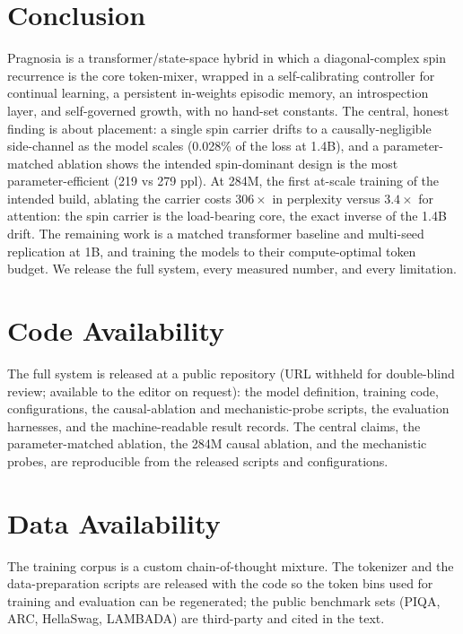 \documentclass[10pt,twocolumn]{article}
\begin{document}
\section{Conclusion}
Pragnosia is a transformer/state-space hybrid in which a diagonal-complex spin recurrence is the core token-mixer, wrapped in a self-calibrating controller for continual learning, a persistent in-weights episodic memory, an introspection layer, and self-governed growth, with no hand-set constants. The central, honest finding is about placement: a single spin carrier drifts to a causally-negligible side-channel as the model scales (0.028\% of the loss at 1.4B), and a parameter-matched ablation shows the intended spin-dominant design is the most parameter-efficient (219 vs 279 ppl). At 284M, the first at-scale training of the intended build, ablating the carrier costs $306\times$ in perplexity versus $3.4\times$ for attention: the spin carrier is the load-bearing core, the exact inverse of the 1.4B drift. The remaining work is a matched transformer baseline and multi-seed replication at 1B, and training the models to their compute-optimal token budget. We release the full system, every measured number, and every limitation.

\section*{Code Availability}
The full system is released at a public repository (URL withheld for double-blind review; available to the editor on request): the model definition, training code, configurations, the causal-ablation and mechanistic-probe scripts, the evaluation harnesses, and the machine-readable result records. The central claims, the parameter-matched ablation, the 284M causal ablation, and the mechanistic probes, are reproducible from the released scripts and configurations.

\section*{Data Availability}
The training corpus is a custom chain-of-thought mixture. The tokenizer and the data-preparation scripts are released with the code so the token bins used for training and evaluation can be regenerated; the public benchmark sets (PIQA, ARC, HellaSwag, LAMBADA) are third-party and cited in the text.



\end{document}
